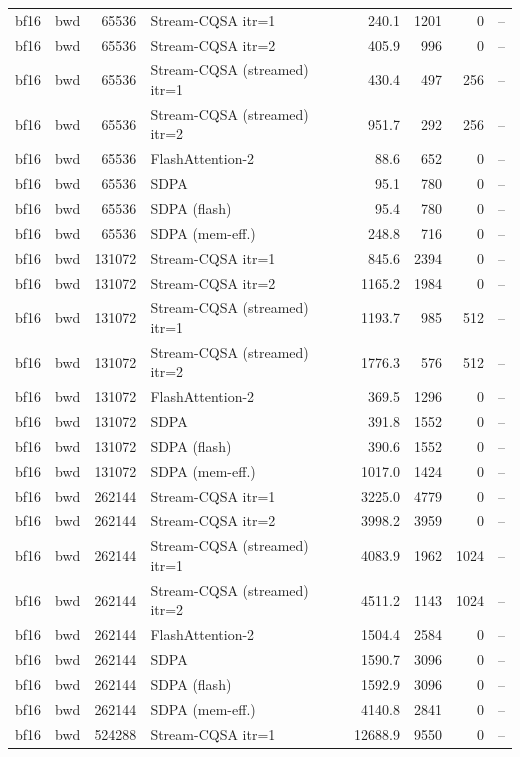 \begin{tabular}{llrlrrrl}
bf16 & bwd & 65536 & Stream-CQSA itr=1 & 240.1 & 1201 & 0 & -- \\
bf16 & bwd & 65536 & Stream-CQSA itr=2 & 405.9 & 996 & 0 & -- \\
bf16 & bwd & 65536 & Stream-CQSA (streamed) itr=1 & 430.4 & 497 & 256 & -- \\
bf16 & bwd & 65536 & Stream-CQSA (streamed) itr=2 & 951.7 & 292 & 256 & -- \\
bf16 & bwd & 65536 & FlashAttention-2 & 88.6 & 652 & 0 & -- \\
bf16 & bwd & 65536 & SDPA & 95.1 & 780 & 0 & -- \\
bf16 & bwd & 65536 & SDPA (flash) & 95.4 & 780 & 0 & -- \\
bf16 & bwd & 65536 & SDPA (mem-eff.) & 248.8 & 716 & 0 & -- \\
bf16 & bwd & 131072 & Stream-CQSA itr=1 & 845.6 & 2394 & 0 & -- \\
bf16 & bwd & 131072 & Stream-CQSA itr=2 & 1165.2 & 1984 & 0 & -- \\
bf16 & bwd & 131072 & Stream-CQSA (streamed) itr=1 & 1193.7 & 985 & 512 & -- \\
bf16 & bwd & 131072 & Stream-CQSA (streamed) itr=2 & 1776.3 & 576 & 512 & -- \\
bf16 & bwd & 131072 & FlashAttention-2 & 369.5 & 1296 & 0 & -- \\
bf16 & bwd & 131072 & SDPA & 391.8 & 1552 & 0 & -- \\
bf16 & bwd & 131072 & SDPA (flash) & 390.6 & 1552 & 0 & -- \\
bf16 & bwd & 131072 & SDPA (mem-eff.) & 1017.0 & 1424 & 0 & -- \\
bf16 & bwd & 262144 & Stream-CQSA itr=1 & 3225.0 & 4779 & 0 & -- \\
bf16 & bwd & 262144 & Stream-CQSA itr=2 & 3998.2 & 3959 & 0 & -- \\
bf16 & bwd & 262144 & Stream-CQSA (streamed) itr=1 & 4083.9 & 1962 & 1024 & -- \\
bf16 & bwd & 262144 & Stream-CQSA (streamed) itr=2 & 4511.2 & 1143 & 1024 & -- \\
bf16 & bwd & 262144 & FlashAttention-2 & 1504.4 & 2584 & 0 & -- \\
bf16 & bwd & 262144 & SDPA & 1590.7 & 3096 & 0 & -- \\
bf16 & bwd & 262144 & SDPA (flash) & 1592.9 & 3096 & 0 & -- \\
bf16 & bwd & 262144 & SDPA (mem-eff.) & 4140.8 & 2841 & 0 & -- \\
bf16 & bwd & 524288 & Stream-CQSA itr=1 & 12688.9 & 9550 & 0 & -- \\

\end{tabular}

